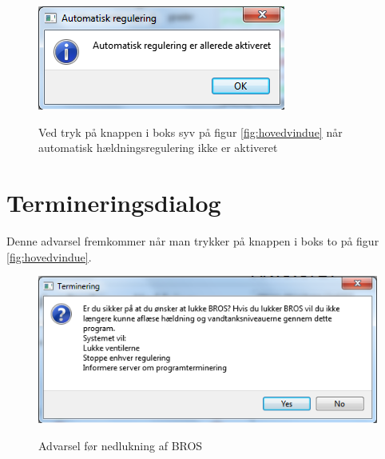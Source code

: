 \begin{figure}[h]
\centering
\includegraphics[scale=1]{billeder/GUI/auto2}
\label{fig:auto1}
\caption{Ved tryk på knappen i boks syv på figur \ref{fig:hovedvindue} når automatisk hældningsregulering ikke er aktiveret}
\end{figure}

\section{Termineringsdialog}
Denne advarsel fremkommer når man trykker på knappen i boks to på figur \ref{fig:hovedvindue}.
\begin{figure}[h]
\centering
\includegraphics[scale=1]{billeder/GUI/termineringsvindue}
\label{fig:terminering}
\caption{Advarsel før nedlukning af BROS}
\end{figure}